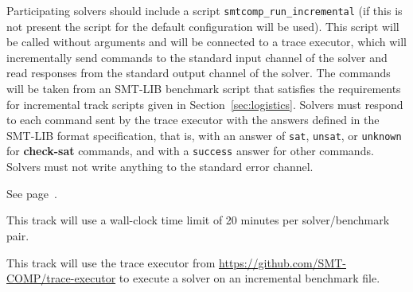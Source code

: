 \documentclass[12pt]{article}
\newcommand{\akey}[1]{\textbf{#1}\xspace}
\newcommand{\rem}[1]{\textcolor{red}{[#1]}}
\newcommand{\todo}[1]{\rem{TODO #1}}
\newcommand{\maintrack}{Single Query Track\xspace}
\newcommand{\inctrack}{Incremental Track\xspace}
\newcommand{\challtrack}{Industry-Challenge Track\xspace}
\begin{document}
Participating solvers should include a script
\texttt{smtcomp\_run\_incremental} (if this is not present the script
for the default configuration will be used). This script will be called
without arguments and will be connected to a trace executor, which
will incrementally send commands to the standard input channel of the
solver and read responses from the standard output channel of the
solver.  The commands will be taken from an SMT-LIB benchmark script
that satisfies the requirements for incremental track scripts given in
Section~\ref{sec:logistics}.
%
Solvers must respond to each command sent by the trace executor with
the answers defined in the SMT-LIB format specification, that is, with
an answer of \texttt{sat}, \texttt{unsat}, or \texttt{unknown} for
\akey{check-sat} commands, and with a \texttt{success} answer for
other commands.
Solvers must not write anything to the standard error channel.

 See page~\pageref{benchmark-selection}.

This track will use a wall-clock time limit of 20 minutes per solver/benchmark
pair.

 This track will use the trace executor from
{\url{https://github.com/SMT-COMP/trace-executor}}
to execute a solver on an incremental benchmark file.




\end{document}
